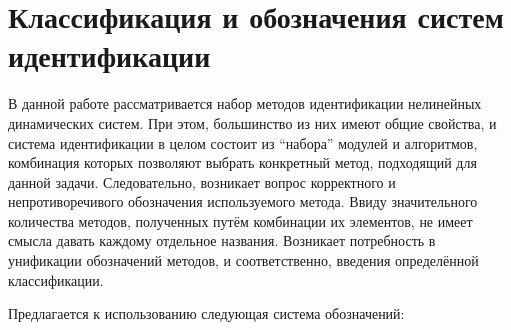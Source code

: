 

\section{Классификация и обозначения систем идентификации}  %
\label{atu:id_classification}

В данной работе рассматривается набор методов идентификации нелинейных динамических
систем. При этом, большинство из них имеют общие свойства, и система идентификации в  целом
состоит из ``набора'' модулей и алгоритмов, комбинация которых
позволяют выбрать конкретный метод, подходящий для данной задачи.
Следовательно, возникает вопрос корректного и непротиворечивого обозначения
используемого метода. Ввиду значительного количества методов, полученных
путём комбинации их элементов, не имеет смысла давать каждому
отдельное названия. Возникает потребность в унификации обозначений
методов, и соответственно, введения определённой классификации.

Предлагается к использованию следующая система обозначений:

